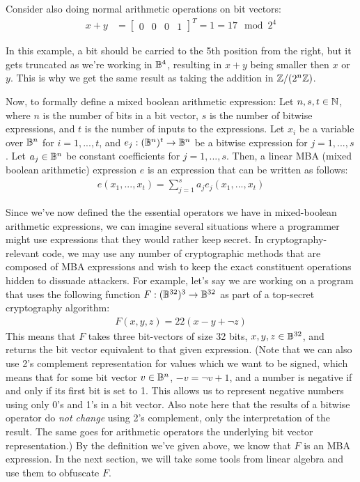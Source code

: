 Consider also doing normal arithmetic operations on bit vectors:
\begin{align*}
x + y &= \begin{bmatrix}
0 & 0 & 0 & 1 
\end{bmatrix}^T = 1 = 17 \mod 2^4 
\end{align*}
\par In this example, a bit should be carried to
the 5th position from the right, but it gets truncated as we're working in $\mathbb{B}^4$, resulting
in $x + y$ being smaller then $x$ or $y$. 
This is why we get the same result as taking the addition in
$\mathbb{Z}/(2^n\mathbb{Z})$.
\par Now, to formally define a mixed boolean arithmetic expression:
 {Let $n,s,t \in \mathbb{N}$, where $n$ is the number of bits in a bit vector, 
$s$ is the number of bitwise expressions, and $t$ is the number of 
inputs to the expressions.
Let $x_i$ be a variable over $\mathbb{B}^n$ for
$i = 1,...,t$, and $e_j : (\mathbb{B}^n)^t \rightarrow \mathbb{B}^n$ be a bitwise expression for
$j = 1,...,s$. Let $a_j\in \mathbb{B}^n$ be constant coefficients for $j = 1,...,s$.
Then, a linear MBA (mixed boolean arithmetic) expression $e$ is an expression that can be written as follows:
\begin{align*}
    e(x_1, ..., x_t) = \sum_{j=1}^s a_j e_j(x_1,...,x_t)
\end{align*}
}
\par Since we've now defined the the essential operators we have in mixed-boolean 
arithmetic
expressions, we can imagine several situations where a programmer might use expressions 
that they would rather keep secret. In cryptography-relevant code, we may use any
number of cryptographic methods that are composed of MBA 
expressions
and wish to keep the exact constituent operations hidden 
to dissuade attackers. For example, let's say we are working on a 
program that uses the following function $F : (\mathbb{B}^{32})^3 \rightarrow \mathbb{B}^{32}$ as part
of a top-secret cryptography algorithm:
\begin{align*}
    F(x, y, z) = 22(x - y + \neg z)
\end{align*}
This means  that $F$ takes three bit-vectors of size 32 bits, $x, y, z \in \mathbb{B}^{32}$, 
and returns the bit vector equivalent to that given expression. 
(Note that we can also use 2's complement representation for values
which we want to be signed, which means that for some
bit vector $v \in \mathbb{B}^n$, $-v = \neg v + 1$, and a number is negative if and only if
its first bit is set to 1. This allows us to represent negative
numbers using only 0's and 1's in a bit vector. Also note here that the results of
a bitwise operator do {\itshape not change} using 2's complement, only the 
interpretation of the result. The same goes for arithmetic operators
the underlying bit vector representation.)
By the definition we've given above, we know that $F$ is an MBA expression. 
In the next section, 
we will take some tools from linear algebra and use them to obfuscate $F$.

